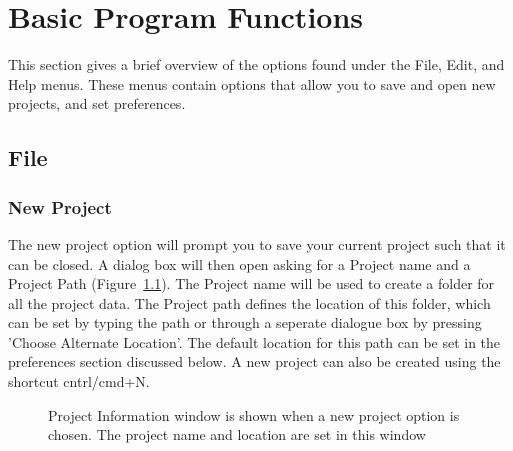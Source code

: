 \documentclass[fleqn,11pt,openany]{book}
\begin{document}
\chapter{Basic Program Functions}
\label{sec:functions}

\begin{introduction}
This section gives a brief overview of the options found under the File, Edit, and Help menus. These menus contain options
that allow you to save and open new projects, and set preferences. 

\end{introduction}

\section{File}
\label{sec:file}

\subsection{New Project}
\label{sec:newproject}
The new project option will prompt you to save your current project such that it can be closed. A dialog box will then open
asking for a Project name and a Project Path (Figure~\ref{fig:newproject}).  The Project name will be used to create a folder for all the project data.  The Project path defines the location of this folder, which can be set by typing the path or through a seperate dialogue box by pressing 'Choose Alternate Location'.  The default location for this path can be set in the preferences section discussed below. A new project can also be created using the shortcut cntrl/cmd+N.

\begin{figure}[h!]
\caption{Project Information window is shown when a new project option is chosen. The project name and location are set in this window}\label{fig:newproject}
\end{figure}
\end{document}
